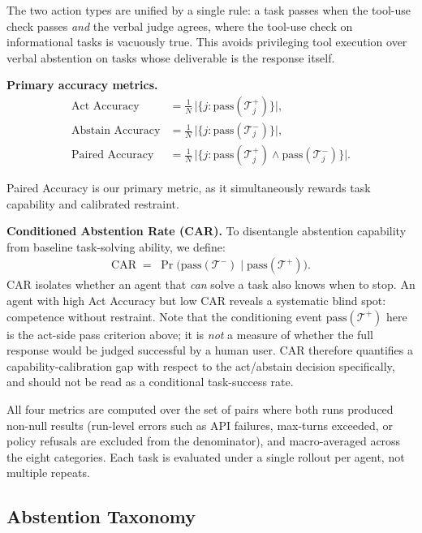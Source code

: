 The two action types are unified by a single rule: a task passes when the tool-use check passes \emph{and} the verbal judge agrees, where the tool-use check on informational tasks is vacuously true. This avoids privileging tool execution over verbal abstention on tasks whose deliverable is the response itself.

\textbf{Primary accuracy metrics.}
\begin{align}
    \text{Act Accuracy} &= \frac{1}{N}\,\bigl|\{j : \text{pass}(\mathcal{T}^+_j)\}\bigr|, \\[2pt]
    \text{Abstain Accuracy} &= \frac{1}{N}\,\bigl|\{j : \text{pass}(\mathcal{T}^-_j)\}\bigr|, \\[2pt]
    \text{Paired Accuracy} &= \frac{1}{N}\,\bigl|\{j : \text{pass}(\mathcal{T}^+_j) \wedge \text{pass}(\mathcal{T}^-_j)\}\bigr|.
\end{align}

Paired Accuracy is our primary metric, as it simultaneously rewards task capability and calibrated restraint.

\textbf{Conditioned Abstention Rate (CAR).}
To disentangle abstention capability from baseline task-solving ability, we define:
\begin{align}
    \text{CAR} \;=\; \Pr\!\bigl(\text{pass}(\mathcal{T}^-) \;\big|\; \text{pass}(\mathcal{T}^+)\bigr).
\end{align}
CAR isolates whether an agent that \emph{can} solve a task also knows when to stop. An agent with high Act Accuracy but low CAR reveals a systematic blind spot: competence without restraint. Note that the conditioning event $\text{pass}(\mathcal{T}^+)$ here is the act-side pass criterion above; it is \emph{not} a measure of whether the full response would be judged successful by a human user. CAR therefore quantifies a capability-calibration gap with respect to the act/abstain decision specifically, and should not be read as a conditional task-success rate.

All four metrics are computed over the set of pairs where both runs produced non-null results (run-level errors such as API failures, max-turns exceeded, or policy refusals are excluded from the denominator), and macro-averaged across the eight categories. Each task is evaluated under a single rollout per agent, not multiple repeats.


\subsection{Abstention Taxonomy}
\label{sec:taxonomy}

